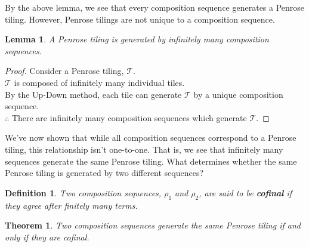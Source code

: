 \documentclass[
  oneside,
  11pt, a4paper,
  footinclude=true,
  headinclude=true,
  cleardoublepage=empty
]{scrbook}
\newtheorem{mydef}{Definition}
\newtheorem{mythm}{Theorem}
\newtheorem{mylem}{Lemma}
\begin{document}
By the above lemma, we see that every composition sequence generates a Penrose tiling. However, Penrose tilings are not unique to a composition sequence.

\begin{mylem}
A Penrose tiling is generated by infinitely many composition sequences.
\end{mylem}

\begin{proof}
Consider a Penrose tiling, $\mathcal{T}$.\\
$\mathcal{T}$ is composed of infinitely many individual tiles.\\
By the Up-Down method, each tile can generate $\mathcal{T}$ by a unique composition sequence.\\
$\therefore$ There are infinitely many composition sequences which generate $\mathcal{T}$.
\end{proof}

We've now shown that while all composition sequences correspond to a Penrose tiling, this relationship isn't one-to-one. That is, we see that infinitely many sequences generate the same Penrose tiling. What determines whether the same Penrose tiling is generated by two different sequences?

\begin{mydef}
Two composition sequences, $\rho_1$ and $\rho_2$, are said to be \textbf{cofinal} if they agree after finitely many terms.
\end{mydef}

\begin{mythm}
Two composition sequences generate the same Penrose tiling if and only if they are cofinal.
\end{mythm}
\end{document}
